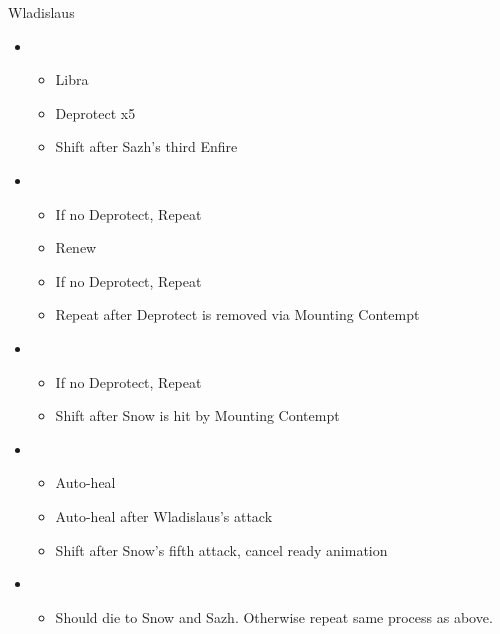 	\begin{battle}[0:42]{Wladislaus}
		\begin{itemize}
			\item \third
			      \begin{itemize}
				      \item Libra
				      \item Deprotect x5
				      \item Shift after Sazh's third Enfire
			      \end{itemize}
			\item \second
			      \begin{itemize}
				      \item If no Deprotect, Repeat
				      \item Renew
				      \item If no Deprotect, Repeat
				      \item Repeat after Deprotect is removed via Mounting Contempt
			      \end{itemize}
			\item \third
			      \begin{itemize}
				      \item If no Deprotect, Repeat
				      \item Shift after Snow is hit by Mounting Contempt
			      \end{itemize}
			\item \first
			      \begin{itemize}
				      \item Auto-heal
				      \item Auto-heal after Wladislaus's attack
				      \item Shift after Snow's fifth attack, cancel ready animation
			      \end{itemize}
			\item \second
			      \begin{itemize}
				      \item Should die to Snow and Sazh. Otherwise repeat same process as above.
			      \end{itemize}
		\end{itemize}
	\end{battle}

